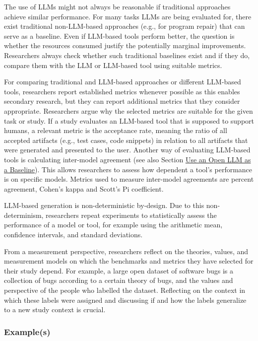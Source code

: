 The use of LLMs might not always be reasonable if traditional approaches achieve similar performance. 
For many tasks LLMs are being evaluated for, there exist traditional non-LLM-based approaches (e.g., for program repair) that can serve as a baseline.
Even if LLM-based tools perform better, the question is whether the resources consumed justify the potentially marginal improvements.
Researchers \should always check whether such traditional baselines exist and if they do, compare them with the LLM or LLM-based tool using suitable metrics.

For comparing traditional and LLM-based approaches or different LLM-based tools, researchers \should report established metrics whenever possible as this enables secondary research, but they can report additional metrics that they consider appropriate.
Researchers \must argue why the selected metrics are suitable for the given task or study. 
If a study evaluates an LLM-based tool that is supposed to support humans, a relevant metric is the acceptance rate, meaning the ratio of all accepted artifacts (e.g., test cases, code snippets) in relation to all artifacts that were generated and presented to the user.
Another way of evaluating LLM-based tools is calculating inter-model agreement (see also Section \href{/guidelines/#use-an-open-llm-as-a-baseline}{Use an Open LLM as a Baseline}).
This allows researchers to assess how dependent a tool's performance is on specific models.
Metrics used to measure inter-model agreements are percent agreement, Cohen's kappa and Scott's Pi coefficient.

LLM-based generation is non-deterministic by-design.
Due to this non-determinism, researchers \should repeat experiments to statistically assess the performance of a model or tool, for example using the arithmetic mean, confidence intervals, and standard deviations.

From a measurement perspective, researchers \should reflect on the theories, values, and measurement models on which the benchmarks and metrics they have selected for their study depend.
For example, a large open dataset of software bugs is a collection of bugs according to a certain theory of bugs, and the values and perspective of the people who labelled the dataset. Reflecting on the context in which these labels were assigned and discussing if and how the labels generalize to a new study context is crucial.

\subsubsection{Example(s)}


